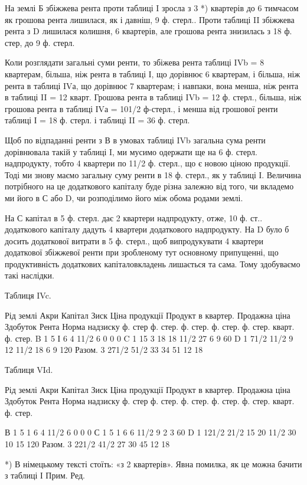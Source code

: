На землі Б збіжжева рента проти таблиці I зросла з 3 *) квартерів до 6
тимчасом як грошова рента лишилася, як і давніш, 9 ф. стерл.. Проти таблиці II
збіжжева рента з D лишилася колишня, 6 квартерів, але грошова рента знизилась
з 18 ф. стер, до 9 ф. стерл.

Коли розглядати загальні суми ренти, то збіжева рента таблиці IVb = 8
квартерам, більша, ніж рента в таблиці І, що дорівнює 6 квартерам, і більша,
ніж рента в таблиці IVа, що дорівнює 7 квартерам; і навпаки, вона менша, ніж
рента в таблиці II = 12 кварт. Грошова рента в таблиці IVb = 12 ф. стерл.,
більша, ніж грошова рента в таблиці ІVа = 101/2 ф-стерл., і менша від грошової
ренти таблиці І = 18 ф. стерл. і таблиці II = 36 ф. стерл.

Щоб по відпаданні ренти з В в умовах таблиці IVb загальна сума ренти
дорівнювала такій у таблиці I, ми мусимо одержати ще на 6 ф. стерл.
надпродукту, тобто 4 квартери по 11/2 ф. стерл., що є новою ціною продукції.
Тоді ми знову маємо загальну суму ренти в 18 ф. стерл., як у таблиці І. Величина
потрібного на це додаткового капіталу буде різна залежно від того, чи
вкладемо ми його в С або D, чи розподілимо його між обома родами землі.

На С капітал в 5 ф. стерл. дає 2 квартери надпродукту, отже, 10 ф. ст..
додаткового капіталу дадуть 4 квартери додаткового надпродукту. На D було б
досить додаткової витрати в 5 ф. стерл., щоб випродукувати 4 квартери додаткової
збіжжевої ренти при зробленому тут основному припущенні, що продуктивність
додаткових капіталовкладень лишається та сама. Тому здобуваємо
такі наслідки.

Таблиця IVc.

Рід землі    Акри    Капітал    Зиск    Ціна  продукції    Продукт в квартер. Продажна  ціна   
Здобуток    Рента        Норма надзиску
        ф. стер    ф. стер. ф. стер. ф. стер. ф. стер. кварт. ф. стер.
B            1    5            І           6     4    11/2    6    0    0    0
C            1    15            3          18    18    11/2    27    6    9    60%
D            1    71/2    11/2    9    12    11/2    18    6    9    120%
Разом.    3    271/2    51/2    33    34                51    12    18

Таблиця VId.

Рід землі    Акри    Капітал    Зиск    Ціна  продукції    Продукт в квартер. Продажна  ціна   
Здобуток    Рента        Норма надзиску
        ф. стер    ф. стер. ф. стер. ф. стер. ф. стер. кварт. ф. стер.

В           1    5            1          6    4    11/2    6     0     0    0
С           1    5            1          6    6    11/2    9     2      3     60%
D           1    121/2    21/2    15    20    11/2    30    10    15    120%
Разом.    3    221/2    41/2    27    30                45    12    18

*) В німецькому тексті стоїть: «з 2 квартерів». Явна помилка, як це можна бачити з таблиці І
Прим. Ред.
